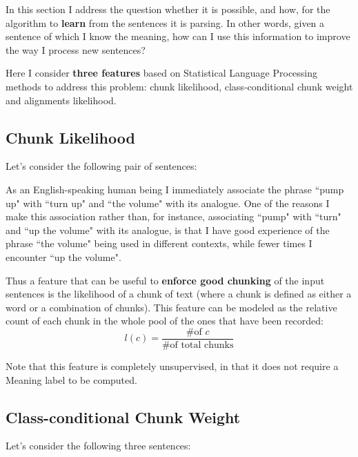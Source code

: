 In this section I address the question whether it is possible, and how, for the algorithm to \textbf{learn} from the sentences it is parsing. In other words, given a sentence of which I know the meaning, how can I use this information to improve the way I process new sentences?

Here I consider \textbf{three features} based on Statistical Language Processing methods to address this problem: chunk likelihood, class-conditional chunk weight and alignments likelihood.

\subsection{Chunk Likelihood} \label{ch3:ml:cl}
Let's consider the following pair of sentences:

As an English-speaking human being I immediately associate the phrase ``pump up" with ``turn up" and ``the volume" with its analogue. One of the reasons I make this association rather than, for instance, associating ``pump" with ``turn" and ``up the volume" with its analogue, is that I have good experience of the phrase ``the volume" being used in different contexts, while fewer times I encounter ``up the volume".

Thus a feature that can be useful to \textbf{enforce good chunking} of the input sentences is the likelihood of a chunk of text (where a chunk is defined as either a word or a combination of chunks). This feature can be modeled as the relative count of each chunk in the whole pool of the ones that have been recorded:
$$
l(c)=\frac{\text{\# of }c}{\text{\# of total chunks}}
$$

Note that this feature is completely unsupervised, in that it does not require a Meaning label to be computed.
\subsection{Class-conditional Chunk Weight} \label{ch3:ml:cc}
Let's consider the following three sentences:


